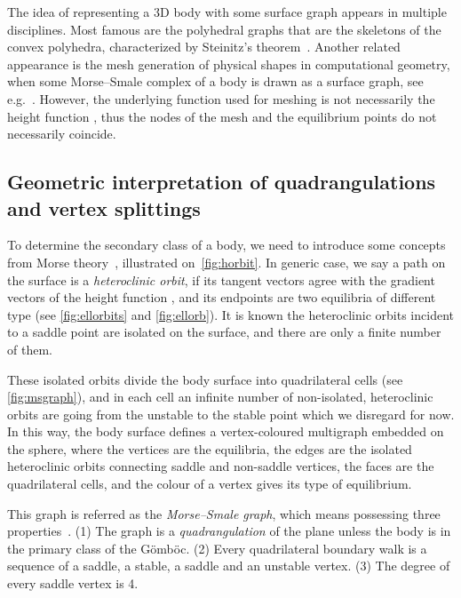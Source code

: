 \documentclass[]{article}
\newcommand{\Gomboc}{Gömböc\xspace}
\begin{document}
The idea of representing a 3D body with some surface graph appears in multiple disciplines.
Most famous are the polyhedral graphs that are the skeletons of the convex polyhedra, characterized by Steinitz's theorem~\cite{Mohar2001}.
Another related appearance is the mesh generation of physical shapes in computational geometry, when some Morse--Smale complex of a body is drawn as a surface graph, see e.g.\  \cite{Dong2006}.
However, the underlying function used for meshing is not necessarily the height function , thus the nodes of the mesh and the equilibrium points do not necessarily coincide.


\subsection{Geometric interpretation of quadrangulations and vertex splittings}

To determine the secondary class of a body, we need to introduce some concepts from Morse theory~\cite{Arnold1978,Edelsbrunner2001}, illustrated on~\autoref{fig:horbit}.
In generic case, we say a path on the surface is a \emph{heteroclinic orbit}, if its tangent vectors agree with the gradient vectors of the height function , and its endpoints are two equilibria of different type (see \autoref{fig:ellorbits} and \ref{fig:ellorb}).
It is known the heteroclinic orbits incident to a saddle point are isolated on the surface, and there are only a finite number of them.

These isolated orbits divide the body surface into quadrilateral cells (see \autoref{fig:msgraph}), and in each cell an infinite number of non-isolated, heteroclinic orbits are going from the unstable to the stable point which we disregard for now.
In this way, the body surface defines a vertex-coloured multigraph embedded on the sphere, where the vertices are the equilibria, the edges are the isolated heteroclinic orbits connecting saddle and non-saddle vertices, the faces are the quadrilateral cells, and the colour of a vertex gives its type of equilibrium.

This graph is referred as the \emph{Morse--Smale graph}, which means possessing three properties~\cite{Arnold1978,Edelsbrunner2001}.
(1) The graph is a \emph{quadrangulation} of the plane unless the body is in the primary class of the \Gomboc.
(2) Every quadrilateral boundary walk is a sequence of a saddle, a stable, a saddle and an unstable vertex.
(3) The degree of every saddle vertex is 4.
\end{document}
